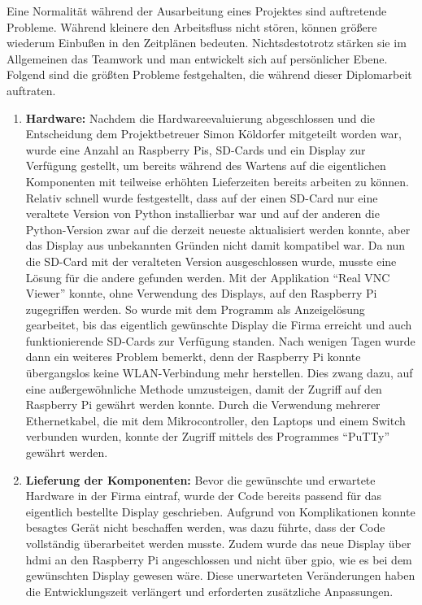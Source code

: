 Eine Normalität während der Ausarbeitung eines Projektes sind auftretende Probleme. Während kleinere den Arbeitsfluss nicht stören, können größere wiederum Einbußen in den Zeitplänen bedeuten. Nichtsdestotrotz stärken sie im Allgemeinen das Teamwork und man entwickelt sich auf persönlicher Ebene.\\ Folgend sind die größten Probleme festgehalten, die während dieser Diplomarbeit auftraten.

\begin{enumerate}
	\item \textbf{Hardware:} Nachdem die Hardwareevaluierung abgeschlossen und die Entscheidung dem Projektbetreuer Simon Köldorfer mitgeteilt worden war, wurde eine Anzahl an Raspberry Pis, SD-Cards und ein Display zur Verfügung gestellt, um bereits während des Wartens auf die eigentlichen Komponenten mit teilweise erhöhten Lieferzeiten bereits arbeiten zu können. Relativ schnell wurde festgestellt, dass auf der einen SD-Card nur eine veraltete Version von Python installierbar war und auf der anderen die Python-Version zwar auf die derzeit neueste aktualisiert werden konnte, aber das Display aus unbekannten Gründen nicht damit kompatibel war. Da nun die SD-Card mit der veralteten Version ausgeschlossen wurde, musste eine Lösung für die andere gefunden werden. Mit der Applikation \enquote{Real VNC Viewer} konnte, ohne Verwendung des Displays, auf den Raspberry Pi zugegriffen werden. So wurde mit dem Programm als Anzeigelösung gearbeitet, bis das eigentlich gewünschte Display die Firma erreicht und auch funktionierende SD-Cards zur Verfügung standen. Nach wenigen Tagen wurde dann ein weiteres Problem bemerkt, denn der Raspberry Pi konnte übergangslos keine WLAN-Verbindung mehr herstellen. Dies zwang dazu, auf eine außergewöhnliche Methode umzusteigen, damit der Zugriff auf den Raspberry Pi gewährt werden konnte. Durch die Verwendung mehrerer Ethernetkabel, die mit dem Mikrocontroller, den Laptops und einem Switch verbunden wurden, konnte der Zugriff mittels des Programmes \enquote{PuTTy} gewährt werden.
	\item \textbf{Lieferung der Komponenten:} Bevor die gewünschte und erwartete Hardware in der Firma eintraf, wurde der Code bereits passend für das eigentlich bestellte Display geschrieben. Aufgrund von Komplikationen konnte besagtes Gerät nicht beschaffen werden, was dazu führte, dass der Code vollständig überarbeitet werden musste. Zudem wurde das neue Display über \gls{hdmi} an den Raspberry Pi angeschlossen und nicht über \gls{gpio}, wie es bei dem gewünschten Display gewesen wäre. Diese unerwarteten Veränderungen haben die Entwicklungszeit verlängert und erforderten zusätzliche Anpassungen.

\end{enumerate}
